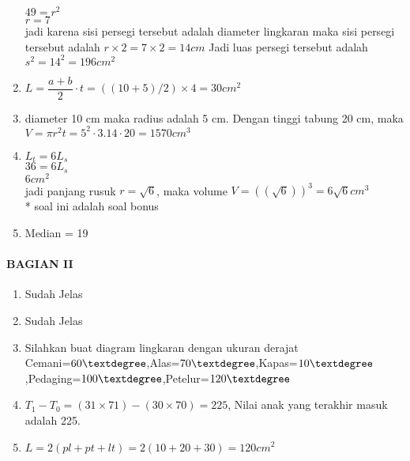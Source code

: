 \documentclass[12pt,a4paper]{article}
\begin{document}
\begin{enumerate}
			  $49=r^2$\\
			  $r=7$\\
			  jadi karena sisi persegi tersebut adalah diameter lingkaran maka sisi persegi tersebut adalah $r\times 2= 7 \times 2=14cm$
			  Jadi luas persegi tersebut adalah $s^2=14^2=196cm^2$ 
		\item $L=\dfrac{a+b}{2}\cdot t=((10+5)/2) \times 4= 30cm^2$
		\item diameter 10 cm maka radius adalah 5 cm. Dengan tinggi tabung 20 cm, maka $V=\pi r^2t=5^2\cdot 3.14\cdot 20= 1570cm^3$
		\item $L_t=6L_s$\\
			  $36=6L_s$\\
			  $6cm^2$\\
			  jadi panjang rusuk $r=\sqrt{6}$, maka volume $V=((\sqrt{6}))^3=6\sqrt{6}cm^3$\\
			  * soal ini adalah soal bonus
		\item Median = 19
	
	
			  
			  
	\end{enumerate}
		\paragraph{BAGIAN II}
	\begin{enumerate}
		\item Sudah Jelas
		\item Sudah Jelas
		\item Silahkan buat diagram lingkaran dengan ukuran derajat\\ Cemani=$60\textdegree$,Alas=$70\textdegree$,Kapas=$10\textdegree$,Pedaging=$100\textdegree$,Petelur=$120\textdegree$
		\item $T_1-T_0=(31\times 71)-(30\times 70)=225$, Nilai anak yang terakhir masuk adalah 225.
		\item $L=2(pl+pt+lt)=2(10+20+30)=120cm^2$
	\end{enumerate}	
\end{document}
